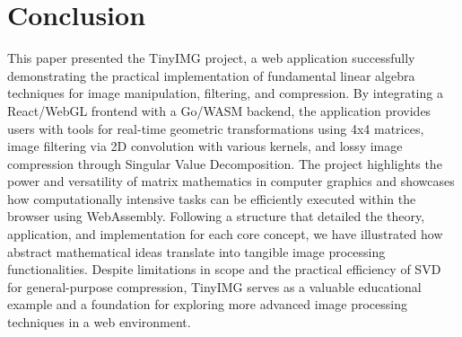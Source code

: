 \documentclass{article}
\begin{document}
\section{Conclusion}
\label{sec:conclusion}
This paper presented the TinyIMG project, a web application successfully demonstrating the practical implementation of fundamental linear algebra techniques for image manipulation, filtering, and compression. By integrating a React/WebGL frontend with a Go/WASM backend, the application provides users with tools for real-time geometric transformations using 4x4 matrices, image filtering via 2D convolution with various kernels, and lossy image compression through Singular Value Decomposition. The project highlights the power and versatility of matrix mathematics in computer graphics and showcases how computationally intensive tasks can be efficiently executed within the browser using WebAssembly. Following a structure that detailed the theory, application, and implementation for each core concept, we have illustrated how abstract mathematical ideas translate into tangible image processing functionalities. Despite limitations in scope and the practical efficiency of SVD for general-purpose compression, TinyIMG serves as a valuable educational example and a foundation for exploring more advanced image processing techniques in a web environment.





\end{document}
